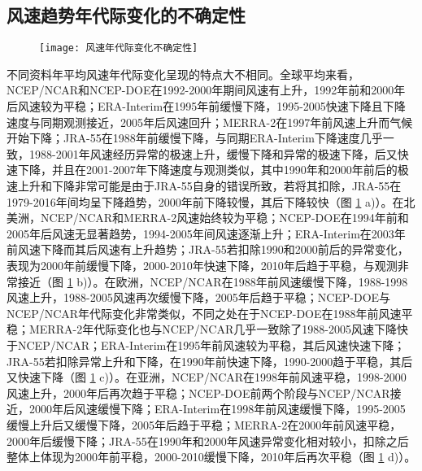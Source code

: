 \subsection{风速趋势年代际变化的不确定性}

\begin{figure}[!b]
    \centering
    \texttt{[image: 风速年代际变化不确定性]}
    \label{fig:uncertaintywinddecadalchange}
\end{figure}

不同资料年平均风速年代际变化呈现的特点大不相同。全球平均来看，NCEP/NCAR和NCEP-DOE在1992-2000年期间风速有上升，1992年前和2000年后风速较为平稳；ERA-Interim在1995年前缓慢下降，1995-2005快速下降且下降速度与同期观测接近，2005年后风速回升；MERRA-2在1997年前风速上升而气候开始下降；JRA-55在1988年前缓慢下降，与同期ERA-Interim下降速度几乎一致，1988-2001年风速经历异常的极速上升，缓慢下降和异常的极速下降，后又快速下降，并且在2001-2007年下降速度与观测类似，其中1990年和2000年前后的极速上升和下降非常可能是由于JRA-55自身的错误所致，若将其扣除，JRA-55在1979-2016年间均呈下降趋势，2000年前下降较慢，其后下降较快（图 \ref{fig:uncertaintywinddecadalchange} a)）。在北美洲，NCEP/NCAR和MERRA-2风速始终较为平稳；NCEP-DOE在1994年前和2005年后风速无显著趋势，1994-2005年间风速逐渐上升；ERA-Interim在2003年前风速下降而其后风速有上升趋势；JRA-55若扣除1990和2000前后的异常变化，表现为2000年前缓慢下降，2000-2010年快速下降，2010年后趋于平稳，与观测非常接近（图 \ref{fig:uncertaintywinddecadalchange} b)）。在欧洲，NCEP/NCAR在1988年前风速缓慢下降，1988-1998风速上升，1988-2005风速再次缓慢下降，2005年后趋于平稳；NCEP-DOE与NCEP/NCAR年代际变化非常类似，不同之处在于NCEP-DOE在1988年前风速平稳；MERRA-2年代际变化也与NCEP/NCAR几乎一致除了1988-2005风速下降快于NCEP/NCAR；ERA-Interim在1995年前风速较为平稳，其后风速快速下降；JRA-55若扣除异常上升和下降，在1990年前快速下降，1990-2000趋于平稳，其后又快速下降（图 \ref{fig:uncertaintywinddecadalchange} c)）。在亚洲，NCEP/NCAR在1998年前风速平稳，1998-2000风速上升，2000年后再次趋于平稳；NCEP-DOE前两个阶段与NCEP/NCAR接近，2000年后风速缓慢下降；ERA-Interim在1998年前风速缓慢下降，1995-2005缓慢上升后又缓慢下降，2005年后趋于平稳；MERRA-2在2000年前风速平稳，2000年后缓慢下降；JRA-55在1990年和2000年风速异常变化相对较小，扣除之后整体上体现为2000年前平稳，2000-2010缓慢下降，2010年后再次平稳（图 \ref{fig:uncertaintywinddecadalchange} d)）。


